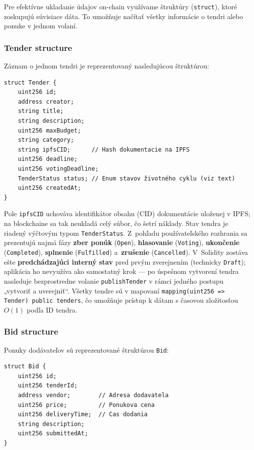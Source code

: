 Pre efektívne ukladanie údajov on-chain využívame štruktúry (\texttt{struct}), ktoré zoskupujú súvisiace dáta. To umožňuje načítať všetky informácie o tendri alebo ponuke v jednom volaní.

\subsubsection{Tender structure}

Záznam o jednom tendri je reprezentovaný nasledujúcou štruktúrou:

\begin{lstlisting}[language=Solidity, caption={Štruktúra Tender v kontrakte MicroTender.sol}, label={lst:tender-struct}]
struct Tender {
    uint256 id;
    address creator;
    string title;
    string description;
    uint256 maxBudget;
    string category;
    string ipfsCID;      // Hash dokumentacie na IPFS
    uint256 deadline;
    uint256 votingDeadline;
    TenderStatus status; // Enum stavov životného cyklu (viz text)
    uint256 createdAt;
}
\end{lstlisting}

Pole \texttt{ipfsCID} uchováva identifikátor obsahu (CID) dokumentácie uloženej v IPFS; na blockchaine sa tak neukladá celý súbor, čo šetrí náklady. Stav tendra je riadený výčtovým typom \texttt{TenderStatus}. Z~pohľadu používateľského rozhrania sa prezentujú najmä fázy \textbf{zber ponúk} (\texttt{Open}), \textbf{hlasovanie} (\texttt{Voting}), \textbf{ukončenie} (\texttt{Completed}), \textbf{splnenie} (\texttt{Fulfilled}) a~\textbf{zrušenie} (\texttt{Cancelled}). V~Solidity zostáva ešte \textbf{predchádzajúci interný stav} pred prvým zverejnením (technicky \texttt{Draft}); aplikácia ho nevyužíva ako samostatný krok --- po úspešnom vytvorení tendra nasleduje bezprostredne volanie \texttt{publishTender} v rámci jedného postupu „vytvoriť a uverejniť“. Všetky tendre sú v mapovaní \texttt{mapping(uint256 => Tender) public tenders}, čo umožňuje prístup k dátam s časovou zložitosťou $O(1)$ podľa ID tendra.

\subsubsection{Bid structure}

Ponuky dodávateľov sú reprezentované štruktúrou \texttt{Bid}:

\begin{lstlisting}[language=Solidity, caption={Štruktúra Bid pre ponuku dodávateľa}, label={lst:bid-struct}]
struct Bid {
    uint256 id;
    uint256 tenderId;
    address vendor;        // Adresa dodavatela
    uint256 price;         // Ponukova cena
    uint256 deliveryTime;  // Cas dodania
    string description;
    uint256 submittedAt;
}
\end{lstlisting}

